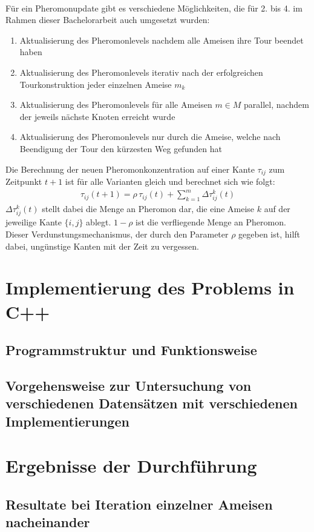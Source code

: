 \documentclass[doktyp=barbeit, sprache=german]{TUBAFarbeiten}
\begin{document}
\\Für ein Pheromonupdate gibt es verschiedene Möglichkeiten, die für 2. bis 4. im Rahmen dieser Bachelorarbeit auch umgesetzt wurden: 
\begin{enumerate}
\item Aktualisierung des Pheromonlevels nachdem alle Ameisen ihre Tour beendet haben
\item Aktualisierung des Pheromonlevels iterativ nach der erfolgreichen Tourkonstruktion jeder einzelnen Ameise $m_k$
\item Aktualisierung des Pheromonlevels für alle Ameisen $m \in M$ parallel, nachdem der jeweils nächste Knoten erreicht wurde
\item Aktualisierung des Pheromonlevels nur durch die Ameise, welche nach Beendigung der Tour den kürzesten Weg gefunden hat
\end{enumerate}
Die Berechnung der neuen Pheromonkonzentration auf einer Kante $\tau_{ij}$ zum Zeitpunkt $t + 1$ ist für alle Varianten gleich und berechnet sich wie folgt:
\begin{align}
\label{eq:Pheromone}
\tau_{ij}(t+1) = \rho \, \tau_{ij}(t) + \sum_{k=1}^m \Delta \tau^k_{ij}(t)
\end{align}
$\Delta \tau^k_{ij}(t)$ stellt dabei die Menge an Pheromon dar, die eine Ameise $k$ auf der jeweilige Kante $\{i,j\}$ ablegt. $1-\rho$ ist die verfliegende Menge an Pheromon. Dieser Verdunstungsmechanismus, der durch den Parameter $\rho$ gegeben ist, hilft dabei, ungünstige Kanten mit der Zeit zu \glqq vergessen\grqq. 
\section{Implementierung des Problems in C++}
\subsection{Programmstruktur und Funktionsweise}
\subsection{Vorgehensweise zur Untersuchung von verschiedenen Datensätzen mit verschiedenen Implementierungen}
\section{Ergebnisse der Durchführung}
\subsection{Resultate bei Iteration einzelner Ameisen nacheinander}
\end{document}
